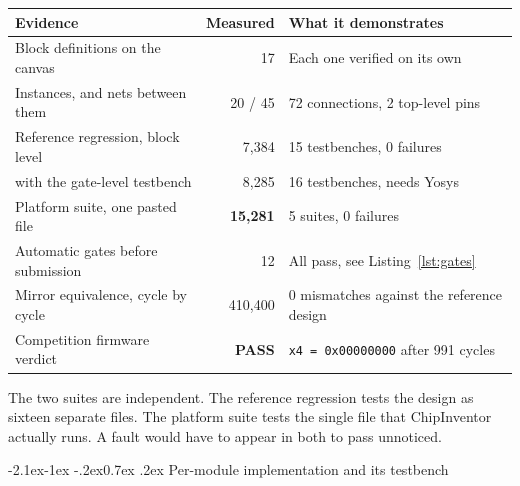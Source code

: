 \documentclass[11pt,a4paper]{article}
\makeatletter
\renewcommand\subsection{\@startsection{subsection}{2}{\z@}%
  {-2.1ex\@plus -1ex \@minus -.2ex}{0.7ex \@plus .2ex}%
  {\color{rvbldark}\normalfont\normalsize\bfseries}}
\newcommand{\hdr}[1]{\textbf{#1}}
\newcommand{\hrow}{\rowcolor{rvbltint}}
\newcommand{\ok}{\textcolor{okgreen}{\textbf{PASS}}}
\makeatother
\begin{document}
\vspace{2pt}
{\small
\begin{tabularx}{\linewidth}{>{\raggedright\arraybackslash}p{5.3cm}rX}
\toprule
\hrow \hdr{Evidence} & \hdr{Measured} & \hdr{What it demonstrates} \\
\midrule
Block definitions on the canvas & 17 & Each one verified on its own \\
Instances, and nets between them & 20 / 45 & 72 connections, 2 top-level pins \\
Reference regression, block level & 7{,}384 & 15 testbenches, 0 failures \\
\quad with the gate-level testbench & 8{,}285 & 16 testbenches, needs Yosys \\
Platform suite, one pasted file & \textbf{15{,}281} & 5 suites, 0 failures \\
Automatic gates before submission & 12 & All pass, see Listing~\ref{lst:gates} \\
Mirror equivalence, cycle by cycle & 410{,}400 & 0 mismatches against the
  reference design \\
Competition firmware verdict & \ok & \texttt{x4 = 0x00000000} after 991 cycles \\
\bottomrule
\end{tabularx}}

\vspace{2pt}
{\footnotesize The two suites are independent. The reference regression tests the design as
sixteen separate files. The platform suite tests the single file that ChipInventor actually
runs. A fault would have to appear in both to pass unnoticed.}





\subsection{Per-module implementation and its testbench}
\end{document}
